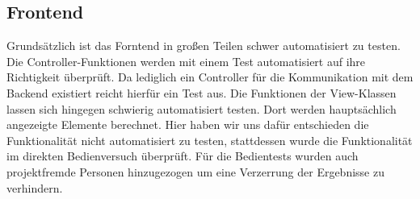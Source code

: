 \subsection{Frontend}
Grundsätzlich ist das Forntend in großen Teilen schwer automatisiert zu testen.
Die Controller-Funktionen werden mit einem Test automatisiert auf ihre Richtigkeit überprüft.
Da lediglich ein Controller für die Kommunikation mit dem Backend existiert reicht hierfür ein Test aus.
Die Funktionen der View-Klassen lassen sich hingegen schwierig automatisiert testen.
Dort werden hauptsächlich angezeigte Elemente berechnet.
Hier haben wir uns dafür entschieden die Funktionalität nicht automatisiert zu testen, stattdessen wurde die Funktionalität im direkten Bedienversuch überprüft.
Für die Bedientests wurden auch projektfremde Personen hinzugezogen um eine Verzerrung der Ergebnisse zu verhindern.